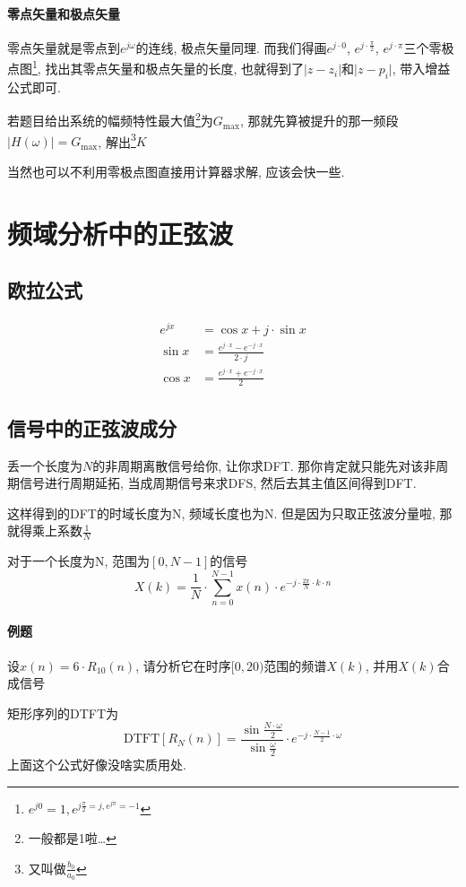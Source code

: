 \documentclass[a4paper]{report}
\begin{document}
\paragraph{零点矢量和极点矢量}零点矢量就是零点到$e^{j\omega}$的连线, 极点矢量同理. 
而我们得画$e^{j\cdot 0}$, $e^{j\cdot \frac{\pi}{2}}$, $e^{j\cdot \pi}$三个零极点图\footnote{$e^{j0}=1, e^{j\frac{\pi}{2}=j, e^{j\pi}=-1}$}, 找出其零点矢量和极点矢量的长度, 也就得到了$\lvert z-z_i\rvert$和$\lvert z-p_i\rvert$, 带入增益公式即可. 

若题目给出系统的幅频特性最大值\footnote{一般都是1啦\dots}为$G_{\max}$, 那就先算被提升的那一频段$\lvert H(\omega)\rvert=G_{\max}$, 解出\footnote{又叫做$\frac{b_0}{a_0}$}$K$

当然也可以不利用零极点图直接用计算器求解, 应该会快一些. 
\section{频域分析中的正弦波}
\subsection{欧拉公式}
\begin{align*}
  e^{jx}&=\cos{x}+j\cdot \sin{x}\\
  \sin{x}&=\frac{e^{j\cdot x}-e^{-j\cdot x}}{2\cdot j}\\
  \cos{x}&=\frac{e^{j\cdot x}+e^{-j\cdot x}}{2}
\end{align*}
\subsection{信号中的正弦波成分}
丢一个长度为$N$的非周期离散信号给你, 让你求DFT. 那你肯定就只能先对该非周期信号进行周期延拓, 当成周期信号来求DFS, 然后去其主值区间得到DFT. 

这样得到的DFT的时域长度为N, 频域长度也为N. 但是因为只取正弦波分量啦, 那就得乘上系数$\frac{1}{N}$


对于一个长度为N, 范围为$[0,N-1]$的信号
\begin{equation}
  X(k)=\frac{1}{N}\cdot \displaystyle\sum_{n=0}^{N-1} x(n)\cdot e^{-j\cdot\frac{2\pi}{N}\cdot k\cdot n}
\end{equation}
\paragraph{例题}
设$x(n)=6\cdot R_{10}(n)$, 请分析它在时序$[0,20)$范围的频谱$X(k)$, 并用$X(k)$合成信号


矩形序列的DTFT为
\begin{equation}
      \text{DTFT}[R_N(n)]=\frac{\sin{\frac{N\cdot\omega}{2}}}{\sin{\frac{\omega}{2}}}\cdot e^{-j\cdot\frac{N-1}{2}\cdot\omega}
\end{equation}
上面这个公式好像没啥实质用处. 
\end{document}
